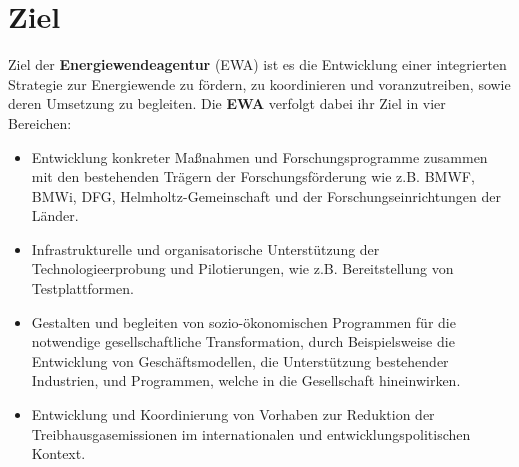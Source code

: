 \section{Ziel}

Ziel der \textbf{Energiewendeagentur} (EWA) ist es die Entwicklung einer integrierten Strategie zur Energiewende zu fördern, zu koordinieren und voranzutreiben, sowie deren Umsetzung zu begleiten.
%
Die \textbf{EWA} verfolgt dabei ihr Ziel in vier Bereichen:
\begin{itemize}
	\item Entwicklung konkreter Maßnahmen und Forschungsprogramme zusammen mit den bestehenden Trägern der Forschungsförderung wie z.B. BMWF, BMWi, DFG, Helmholtz-Gemeinschaft und der Forschungseinrichtungen der Länder.
	
	\item Infrastrukturelle und organisatorische Unterstützung der Technologieerprobung und Pilotierungen, wie z.B. Bereitstellung von Testplattformen.
	
	\item Gestalten und begleiten von sozio-ökonomischen Programmen für die notwendige gesellschaftliche Transformation, durch Beispielsweise die Entwicklung von Geschäftsmodellen, die Unterstützung bestehender Industrien, und Programmen, welche in die Gesellschaft hineinwirken.
	
	\item Entwicklung und Koordinierung von Vorhaben zur Reduktion der Treibhausgasemissionen im internationalen und entwicklungspolitischen Kontext.
\end{itemize}

